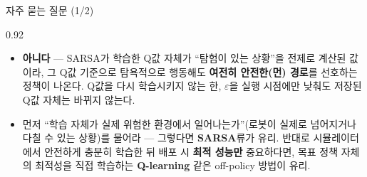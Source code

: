 \begin{frame}{자주 묻는 질문 (1/2)}
\begin{center}\begin{varwidth}{0.92\textwidth}
  \begin{itemize}
    \item {}
      \textbf{아니다} --- SARSA가 학습한 Q값 자체가 ``탐험이 있는
      상황''을 전제로 계산된 값이라, 그 Q값 기준으로 탐욕적으로
      행동해도 \textbf{여전히 안전한(먼) 경로}를 선호하는 정책이
      나온다. Q값을 다시 학습시키지 않는 한, $\varepsilon$을 실행
      시점에만 낮춰도 저장된 Q값 자체는 바뀌지 않는다.
    \item {}
      먼저 ``학습 자체가 실제 위험한 환경에서 일어나는가''(로봇이
      실제로 넘어지거나 다칠 수 있는 상황)를 물어라 --- 그렇다면
      \textbf{SARSA}류가 유리.
      반대로 시뮬레이터에서 안전하게 충분히 학습한 뒤 배포 시
      \textbf{최적 성능만} 중요하다면, 목표 정책 자체의 최적성을
      직접 학습하는 \textbf{Q-learning} 같은 off-policy 방법이 유리.
  \end{itemize}
\end{varwidth}\end{center}
\end{frame}
